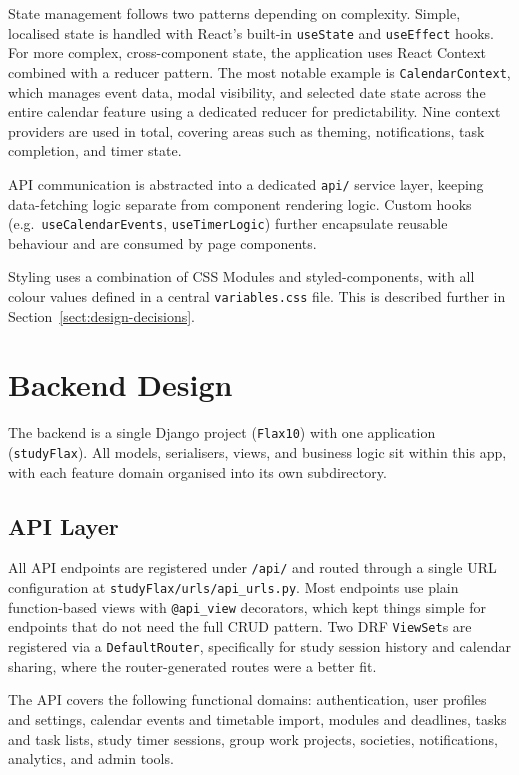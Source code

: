 State management follows two patterns depending on complexity. Simple, localised state is handled with React's built-in \texttt{useState} and \texttt{useEffect} hooks. For more complex, cross-component state, the application uses React Context combined with a reducer pattern. The most notable example is \texttt{CalendarContext}, which manages event data, modal visibility, and selected date state across the entire calendar feature using a dedicated reducer for predictability. Nine context providers are used in total, covering areas such as theming, 
notifications, task completion, and timer state.

API communication is abstracted into a dedicated \texttt{api/} service layer, keeping data-fetching logic separate from component rendering logic. Custom hooks (e.g.\ \texttt{useCalendarEvents}, \texttt{useTimerLogic}) further encapsulate reusable behaviour and are consumed by page components.

Styling uses a combination of CSS Modules and styled-components, with all colour values defined in a central \texttt{variables.css} file. This is described further in Section~\ref{sect:design-decisions}.

\section{Backend Design}
\label{sect:backend}

The backend is a single Django project (\texttt{Flax10}) with one application (\texttt{studyFlax}). All models, serialisers, views, and business logic sit within this app, with each feature domain organised into its own subdirectory.

\subsection{API Layer}

All API endpoints are registered under \texttt{/api/} and routed through a single URL configuration at \texttt{studyFlax/urls/api\_urls.py}. Most endpoints use plain function-based views with \texttt{@api\_view} decorators, which kept things simple for endpoints that do not need the full CRUD pattern. Two DRF \texttt{ViewSet}s are registered via a \texttt{DefaultRouter}, specifically for study session history and calendar sharing, where the router-generated routes were a better fit.

The API covers the following functional domains: authentication, user profiles and settings, calendar events and timetable import, modules and deadlines, tasks and task lists, study timer sessions, group work projects, societies, notifications, analytics, and admin tools.

